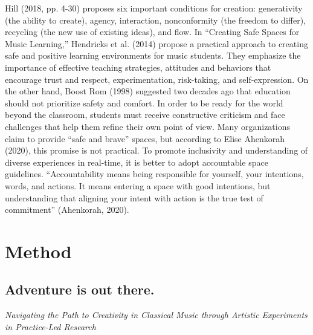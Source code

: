 \documentclass[authordate, empirical, issue]{jote-new-article}
\begin{document}
Hill (2018, pp. 4-30) proposes six important conditions for creation: generativity (the ability to create), agency, interaction, nonconformity (the freedom to differ), recycling (the new use of existing ideas), and flow. In “Creating Safe Spaces for Music Learning,” Hendricks et al. (2014) propose a practical approach to creating safe and positive learning environments for music students. They emphasize the importance of effective teaching strategies, attitudes and behaviors that encourage trust and respect, experimentation, risk-taking, and self-expression. On the other hand, Boost Rom (1998) suggested two decades ago that education should not prioritize safety and comfort. In order to be ready for the world beyond the classroom, students must receive constructive criticism and face challenges that help them refine their own point of view. Many organizations claim to provide “safe and brave” spaces, but according to Elise Ahenkorah (2020), this promise is not practical. To promote inclusivity and understanding of diverse experiences in real-time, it is better to adopt accountable space guidelines. “Accountability means being responsible for yourself, your intentions, words, and actions. It means entering a space with good intentions, but understanding that aligning your intent with action is the true test of commitment” (Ahenkorah, 2020).



\section{Method }



\subsection{Adventure is out there.}



\noindent\emph{Navigating the Path to Creativity in Classical Music through Artistic Experiments in Practice-Led Research}
\\
\end{document}
